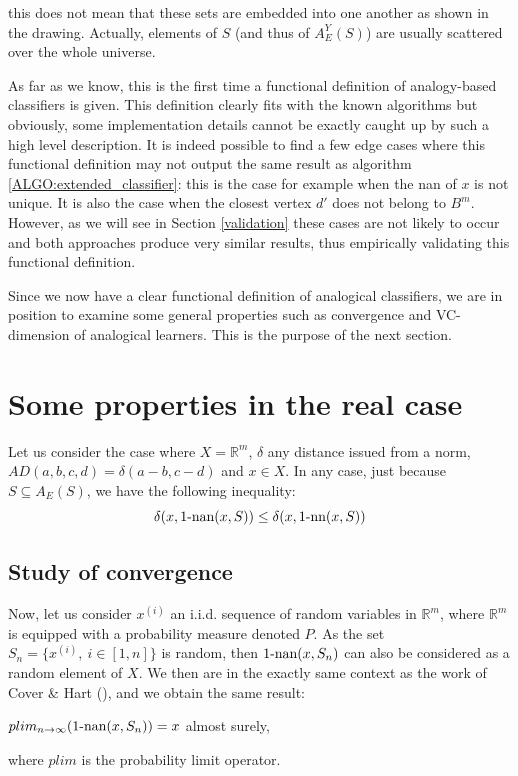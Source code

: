 this does not mean that these sets are embedded into one another as shown in
the drawing. Actually, elements of $S$ (and thus of $A_E^Y(S)$) are usually
scattered over the whole universe.

As far as we know, this is the first time a functional definition of
analogy-based classifiers is given. This definition clearly fits with the known
algorithms but obviously, some implementation details cannot be exactly caught
up by such a high level description. It is indeed possible to find a few edge
cases where this functional definition may not output the same result as
algorithm \ref{ALGO:extended_classifier}: this is the case for example when the nan of $x$
is not unique. It is
also the case when the closest vertex $d'$ does not belong to $B^m$.  However,
as we will see in Section \ref{validation} these cases are not likely to occur
and both approaches produce very similar results, thus empirically validating
this functional definition.

Since we now have a clear functional definition of analogical classifiers, we
are in position to examine some general properties such as convergence and
VC-dimension of analogical learners. This is the purpose of the next section.

\section{Some properties in the real case}\label{convergence}
Let us consider the case where $X=\mathbb{R}^m$, $\delta$ any distance issued
from a norm, $AD(a,b,c,d)=\delta(a-b,c-d)$ and $x \in X$.  In any case, just
because $S \subseteq A_E(S)$, we have the following inequality:
$$\delta(x, 1\mbox{-nan}(x,S)) \leq \delta(x, 1\mbox{-nn}(x,S))$$

\subsection{Study of convergence}

Now, let us consider  $x^{(i)}$ an i.i.d. sequence of random variables in
$\mathbb{R}^m$, where $\mathbb{R}^m$ is equipped with a probability measure
denoted $P$. As the set $S_n=\{x^{(i)}, ~ i \in [1, n]\}$ is random, then
$1\mbox{-nan}(x,S_n)$ can also be considered as a random element of $X$.  We then are
in the exactly same context as the work of Cover \& Hart (\cite{CovHarTIT67}), and
we obtain the same result:
\begin{property}\label{propconvergence}
$plim_{n \to \infty}(1\mbox{-nan}(x,S_n))=x$ almost surely,
\end{property}
where $plim$ is the probability limit operator.

